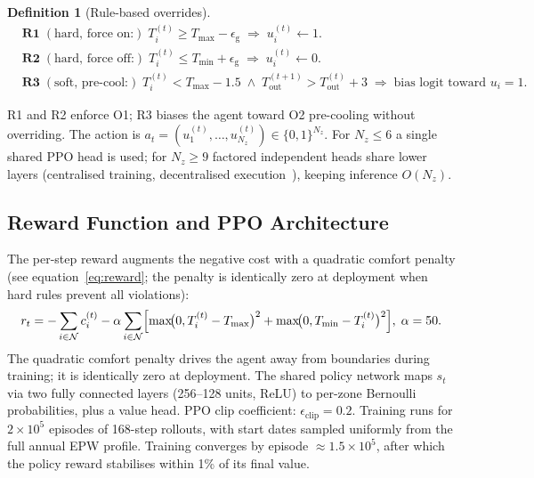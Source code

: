 \documentclass[12pt,a4paper]{article}
\let\oldsubsection\subsection
\renewcommand{\subsection}[1]{\FloatBarrier\oldsubsection{#1}}
\newtheorem{definition}{Definition}
\newcommand{\Tmin}{T_{\min}}
\newcommand{\Tmax}{T_{\max}}
\newcommand{\Tout}{T_{\mathrm{out}}}
\begin{document}
\begin{definition}[Rule-based overrides]
\label{def:rules}
\begin{align}
  &\textbf{R1}\;(\text{hard, force on:})\;
    T_i^{(t)}\ge\Tmax-\epsilon_{\mathrm{g}}
    \;\Rightarrow\;u_i^{(t)}\leftarrow1. \label{eq:R1}\\
  &\textbf{R2}\;(\text{hard, force off:})\;
    T_i^{(t)}\le\Tmin+\epsilon_{\mathrm{g}}
    \;\Rightarrow\;u_i^{(t)}\leftarrow0. \label{eq:R2}\\
  &\textbf{R3}\;(\text{soft, pre-cool:})\;
    T_i^{(t)}<\Tmax{-}1.5\;\wedge\;\Tout^{(t+1)}>\Tout^{(t)}{+}3
    \;\Rightarrow\;\text{bias logit toward }u_i{=}1. \label{eq:R3}
\end{align}
\end{definition}

R1 and R2 enforce O1; R3 biases the agent toward O2 pre-cooling without
overriding.
The action is $a_t=(u_1^{(t)},\ldots,u_{N_z}^{(t)})\in\{0,1\}^{N_z}$.
For $N_z\le6$ a single shared PPO head is used; for $N_z\ge9$ factored
independent heads share lower layers (centralised training, decentralised
execution~\cite{Yu2021}), keeping inference $O(N_z)$.

\subsection{Reward Function and PPO Architecture}
\label{subsec:reward}

The per-step reward augments the negative cost with a quadratic comfort
penalty (see equation~\eqref{eq:reward}; the penalty is identically zero
at deployment when hard rules prevent all violations):
\begin{equation}
  r_t=-\sum_{i\in\mathcal{N}}c_i^{(t)}
  -\alpha\sum_{i\in\mathcal{N}}
  \Bigl[\max\!\bigl(0,T_i^{(t)}-\Tmax\bigr)^2
       +\max\!\bigl(0,\Tmin-T_i^{(t)}\bigr)^2\Bigr],
  \;\alpha=50.
  \label{eq:reward}
\end{equation}
The quadratic comfort penalty drives the agent away from boundaries
during training; it is identically zero at deployment.
The shared policy network maps $s_t$ via two fully connected layers
(256--128 units, ReLU) to per-zone Bernoulli probabilities, plus a value
head.
PPO clip coefficient: $\epsilon_{\mathrm{clip}}=0.2$.
Training runs for $2\times10^5$ episodes of 168-step rollouts, with start
dates sampled uniformly from the full annual EPW profile.
Training converges by episode $\approx1.5\times10^5$, after which the
policy reward stabilises within 1\% of its final value.
\end{document}
